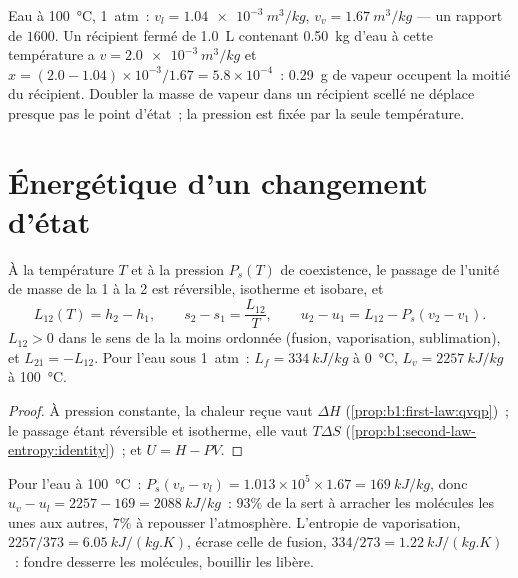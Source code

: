 \begin{example}\label{ex:b1:phase-changes:lever}
Eau à \qty{100}{\degreeCelsius}, \qty{1}{atm}~: $v_l = \qty{1.04e-3}{m^3/kg}$,
$v_v = \qty{1.67}{m^3/kg}$ --- un rapport de $1600$. Un récipient fermé de
\qty{1.0}{L} contenant \qty{0.50}{kg} d'eau à cette température a $v =
\qty{2.0e-3}{m^3/kg}$ et $x = (2.0 - 1.04) \times 10^{-3}/1.67 = 5.8 \times 10^{-4}$~:
\qty{0.29}{g} de vapeur occupent la moitié du récipient. Doubler la masse de
vapeur dans un récipient scellé ne déplace presque pas le point d'état~; la
pression est fixée par la seule température.
\end{example}

\section{Énergétique d'un changement d'état}

\begin{proposition}\label{prop:b1:phase-changes:latent}
À la température $T$ et à la pression $P_s(T)$ de coexistence, le passage de
l'unité de masse de la  1 à la  2 est réversible, isotherme et
isobare, et
\[
L_{12}(T) = h_2 - h_1 , \qquad s_2 - s_1 = \frac{L_{12}}{T} , \qquad
u_2 - u_1 = L_{12} - P_s(v_2 - v_1) .
\]
$L_{12} > 0$ dans le sens de la  la moins ordonnée (fusion,
vaporisation, sublimation), et $L_{21} = -L_{12}$. Pour l'eau sous \qty{1}{atm}~:
$L_f = \qty{334}{kJ/kg}$ à \qty{0}{\degreeCelsius}, $L_v = \qty{2257}{kJ/kg}$ à
\qty{100}{\degreeCelsius}.
\end{proposition}

\begin{proof}
À pression constante, la chaleur reçue vaut $\Delta H$
(\cref{prop:b1:first-law:qvqp})~; le passage étant réversible et isotherme,
elle vaut $T\Delta S$ (\cref{prop:b1:second-law-entropy:identity})~; et $U = H - PV$.
\end{proof}

\begin{example}\label{ex:b1:phase-changes:whereheat}
Pour l'eau à \qty{100}{\degreeCelsius}~: $P_s(v_v - v_l) = 1.013 \times 10^5 \times
1.67 = \qty{169}{kJ/kg}$, donc $u_v - u_l = 2257 - 169 = \qty{2088}{kJ/kg}$~:
$93\%$ de la  sert à arracher les molécules les unes aux
autres, $7\%$ à repousser l'atmosphère. L'entropie de vaporisation,
$2257/373 = \qty{6.05}{kJ/(kg.K)}$, écrase celle de fusion, $334/273 =
\qty{1.22}{kJ/(kg.K)}$~: fondre desserre les molécules, bouillir les libère.
\end{example}

